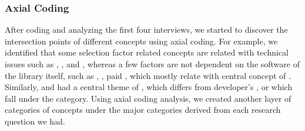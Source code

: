 \subsubsection{Axial Coding} After coding and analyzing the first four interviews, we started to discover the intersection points of different concepts using axial coding. For example, we identified that some selection factor related concepts are related with technical issues such as , , and , whereas a few factors are not dependent on the software of the library itself, such as , , paid , which mostly relate with central concept of . Similarly,  and  had a central theme of , which differs from developer's ,  or  which fall under the  category. Using axial coding analysis, we created another layer of categories of concepts under the major categories derived from each research question we had. 


